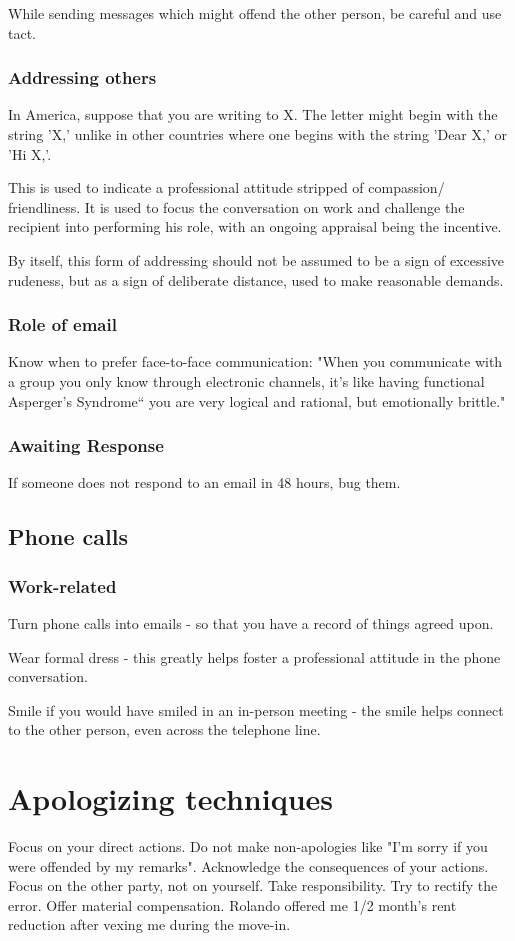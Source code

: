 \documentclass[oneside, article]{memoir}
\begin{document}
While sending messages which might offend the other person, be careful and use tact.

\subsection{Addressing others}
In America, suppose that you are writing to X. The letter might begin with the string 'X,' unlike in other countries where one begins with the string 'Dear X,' or 'Hi X,'.

This is used to indicate a professional attitude stripped of compassion/ friendliness. It is used to focus the conversation on work and challenge the recipient into performing his role, with an ongoing appraisal being the incentive.

By itself, this form of addressing should not be assumed to be a sign of excessive rudeness, but as a sign of deliberate distance, used to make reasonable demands.

\subsection{Role of email}
Know when to prefer face-to-face communication: "When you communicate with a group you only know through electronic channels, it's like having functional Asperger's Syndrome`` you are very logical and rational, but emotionally brittle." 

\subsection{Awaiting Response}
If someone does not respond to an email in 48 hours, bug them.


\section{Phone calls}
\subsection{Work-related}
Turn phone calls into emails - so that you have a record of things agreed upon.

Wear formal dress - this greatly helps foster a professional attitude in the phone conversation.

Smile if you would have smiled in an in-person meeting - the smile helps connect to the other person, even across the telephone line.

\chapter{Apologizing techniques}
\subitem Focus on your direct actions. Do not make non-apologies like "I'm sorry if you were offended by my remarks".
\subitem Acknowledge the consequences of your actions.
\subitem Focus on the other party, not on yourself.
\subitem Take responsibility.
\subitem Try to rectify the error.
\subitem Offer material compensation. Rolando offered me 1/2 month's rent reduction after vexing me during the move-in.
\end{document}
